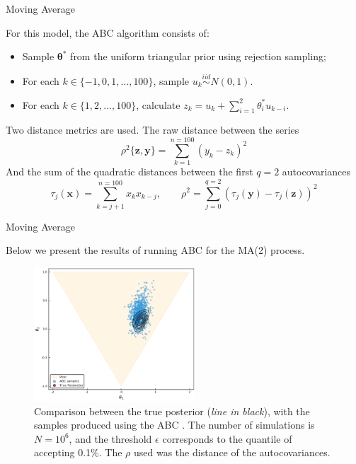 \documentclass[10pt]{beamer}
\begin{document}
\begin{frame}[fragile]{Moving Average}

  For this model, the ABC algorithm consists of:
  \begin{itemize}
    \item Sample $\bm \theta ^ *$ from the uniform triangular prior
    using rejection sampling;
    \item For each $k \in \{-1,0, 1, ..., 100 \}$, sample
    $u_k \overset{iid}{\sim} N(0,1)$.
    \item For each $k \in \{ 1, 2, ..., 100\}$, calculate 
    $z_k = u_k + \sum^2_{i=1}\theta_i^* u_{k-i}$.
  \end{itemize}

  Two distance metrics are used. The raw distance between the series
  $$
  \rho^2\{ \bm z, \bm y\} = \sum^{n=100}_{k=1}(y_k - z_k)^2
  $$
  And the sum of the quadratic distances between the first $q = 2$
  autocovariances
  $$
  \tau_j(\bm x) = \sum^{n=100}_{k = j+1} x_k x_{k-j}, \quad \quad
  \rho^2 = \sum^{q=2}_{j=0}(\tau_j(\bm y) - \tau_j(\bm z))^2
  $$

\end{frame}

\begin{frame}[fragile]{Moving Average}

  Below we present the results of running ABC for the MA(2) process.
    \begin{figure}[H]
        \centering
        \includegraphics[width=6cm]{images/ABCmodel1.png}
        \caption{Comparison between the true posterior
        (\textit{line in black}), with the samples produced using the ABC
        . The number of simulations is $N = 10^6$,
        and the threshold $\epsilon$ corresponds to the quantile of
        accepting 0.1\%. The $\rho$ used was the distance
        of the autocovariances.}
    \end{figure}

\end{frame}
\end{document}
